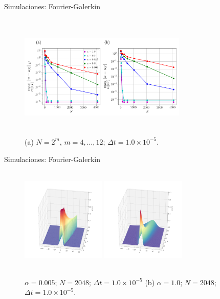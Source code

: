 \label{Figuras-Galerkin}
\begin{frame}{Simulaciones: Fourier-Galerkin \hspace{2cm} \hyperlink{Navegador}{}}
\begin{figure}
        \centering
        \includegraphics[height=6cm,width=8cm]{files/figures/viscid/galerkin/alphas_Error_N.png}
        \caption{(a) $N = 2^m$, $m = 4, \dots, 12$; $\Delta t = 1.0 \times 10^{-5}$.}
    \end{figure}
\end{frame}

\begin{frame}{Simulaciones: Fourier-Galerkin \hspace{2cm} \hyperlink{Navegador}{}}
    \begin{figure}
        \centering
        \includegraphics[height=5cm,width=4cm]{files/figures/viscid/galerkin/Numerical_Solution_alpha=0005.png}
        \qquad
        \includegraphics[height=5cm,width=4cm]{files/figures/viscid/galerkin/Numerical_Solution_alpha=1.png}
        \caption{ $\alpha = 0.005$; $N=2048$; $\Delta t = 1.0 \times 10^{-5}$ (b) $\alpha = 1.0$; $N=2048$; $\Delta t = 1.0 \times 10^{-5}$.}
    \end{figure}
\end{frame}

